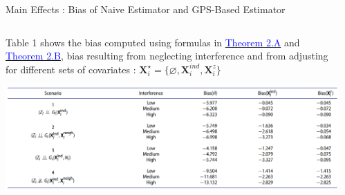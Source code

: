 \documentclass[notes,11pt, aspectratio=169]{beamer}
\begin{document}
\begin{frame}{Main Effects : Bias of Naive Estimator and GPS-Based Estimator}
\begin{columns}[T] %
\begin{column}{1\textwidth}
  \begin{wideitemize}
  \item Table 1 shows the bias computed using formulas in \hyperlink{theorem 2.A}{\textcolor{blue}{Theorem 2.A}} and \hyperlink{theorem2.B}{\textcolor{blue}{Theorem 2.B}}, bias resulting from neglecting interference and from adjusting for different sets of covariates : $\mathbf{X}_i^{\star}=\{\varnothing , \mathbf{X}_i^{ind}, \mathbf{X}_i^{z}\}$
   \begin{table}[h]
   \centering
   \includegraphics[scale=0.45]{table1.png}
   \caption{Computed bias for $\tau$}
   \label{tab:tab1}
   \end{table}
  \end{wideitemize}
 \end{column}%
\hfill%
\begin{column}{.38\textwidth}
  \vspace{20pt}
  \vspace{20pt}
\end{column}%
\end{columns}
\end{frame}
\end{document}
